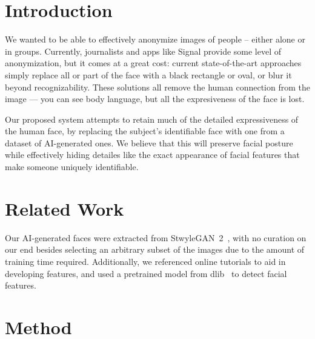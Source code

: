 \section{Introduction}


We wanted to be able to effectively anonymize images of people -- either alone or in groups. Currently, journalists and apps like Signal provide some level of anonymization, but it comes at a great cost: current state-of-the-art approaches simply replace all or part of the face with a black rectangle or oval, or blur it beyond recognizability. These solutions all remove the human connection from the image — you can see body language, but all the expresiveness of the face is lost.

Our proposed system attempts to retain much of the detailed expressiveness of the human face, by replacing the subject's identifiable face with one from a dataset of AI-generated ones. We believe that this will preserve facial posture while effectively hiding detailes like the exact appearance of facial features that make someone uniquely identifiable.

\section{Related Work}


Our AI-generated faces were extracted from StwyleGAN~2~\cite{Karras2019stylegan2}, with no curation on our end besides selecting an arbitrary subset of the images due to the amount of training time required. Additionally, we referenced online tutorials \cite{serengil_2021}\cite{there_2019} to aid in developing features, and used a pretrained model from dlib~\cite{guoquanhao_2019} to detect facial features.

\section{Method}

